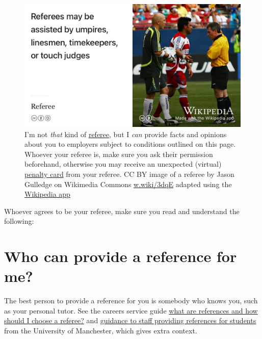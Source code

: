\documentclass[
  12pt,
]{book}
\begin{document}
\begin{figure}

{\centering \includegraphics[width=0.99\linewidth]{images/referee} 

}

\caption{I'm not \emph{that} kind of \href{https://en.wikipedia.org/wiki/Referee}{referee}, but I \emph{can} provide facts and opinions about you to employers subject to conditions outlined on this page. Whoever your referee is, make sure you ask their permission beforehand, otherwise you may receive an unexpected (virtual) \href{https://en.wikipedia.org/wiki/Penalty_card}{penalty card} from your referee. CC BY image of a referee by Jason Gulledge on Wikimedia Commons \href{https://w.wiki/3dqE}{w.wiki/3dqE} adapted using the \href{https://apps.apple.com/us/app/wikipedia/id324715238}{Wikipedia app}}\label{fig:referee-fig}
\end{figure}



Whoever agrees to be your referee, make sure you read and understand the following:

\hypertarget{who-can-provide-a-reference-for-me}{%
\section{Who can provide a reference for me?}\label{who-can-provide-a-reference-for-me}}

The best person to provide a reference for you is somebody who knows you, such as your personal tutor. See the careers service guide \href{http://www.careers.manchester.ac.uk/applicationsinterviews/faqs/references}{what are references and how should I choose a referee?} and \href{http://documents.manchester.ac.uk/display.aspx?DocID=1921}{guidance to staff providing references for students} from the University of Manchester, which gives extra context.
\end{document}
